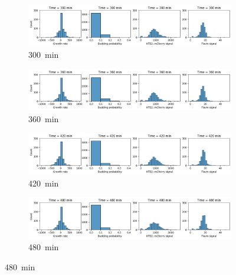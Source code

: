 \begin{figure}
  \centering
  \begin{subfigure}[htpb]{0.9\textwidth}
   \centering
   \includegraphics[width=\textwidth]{613_distribs_0300}
   \caption{
     \SI{300}{\minute}
   }
   \label{fig:biology-kdeficient-distribs-0300}
  \end{subfigure}

  \begin{subfigure}[htpb]{0.9\textwidth}
   \centering
   \includegraphics[width=\textwidth]{613_distribs_0360}
   \caption{
     \SI{360}{\minute}
   }
   \label{fig:biology-kdeficient-distribs-0360}
  \end{subfigure}

  \begin{subfigure}[htpb]{0.9\textwidth}
   \centering
   \includegraphics[width=\textwidth]{613_distribs_0420}
   \caption{
     \SI{420}{\minute}
   }
   \label{fig:biology-kdeficient-distribs-0420}
  \end{subfigure}

  \begin{subfigure}[htpb]{0.9\textwidth}
   \centering
   \includegraphics[width=\textwidth]{613_distribs_0480}
   \caption{
     \SI{480}{\minute}
   }
   \label{fig:biology-kdeficient-distribs-0480}
  \end{subfigure}


\end{figure}
